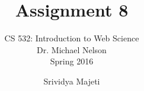 \documentclass[envcountsame,envcountchap]{svmono}
\begin{document}
\author{Srividya Majeti}
\title{Assignment 8}

\subtitle{CS 532:  Introduction to Web Science\\Dr. Michael Nelson\\Spring 2016}

\maketitle

\frontmatter

\tableofcontents

\mainmatter







\backmatter
 		
\nocite{*}  					
\small  					


\end{document}

